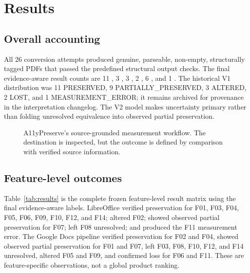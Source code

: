 \section{Results}
\label{sec:results}

\subsection{Overall accounting}

All 26 conversion attempts produced genuine, parseable, non-empty, structurally tagged PDFs that passed the predefined structural output checks. The final evidence-aware result counts are 11 \verifiedpreserved{}, 3 \observedpartial{}, 3 \altered{}, 2 \confirmedlost{}, 6 \unresolved{}, and 1 \measured{}. The historical V1 distribution was 11 PRESERVED, 9 PARTIALLY\_PRESERVED, 3 ALTERED, 2 LOST, and 1 MEASUREMENT\_ERROR; it remains archived for provenance in the interpretation changelog. The V2 model makes uncertainty primary rather than folding unresolved equivalence into observed partial preservation.

\begin{figure}[t]
\centering
{}
\caption{A11yPreserve's source-grounded measurement workflow. The destination is inspected, but the outcome is defined by comparison with verified source information.}
\label{fig:workflow}
\end{figure}

\subsection{Feature-level outcomes}

Table~\ref{tab:results} is the complete frozen feature-level result matrix using the final evidence-aware labels. LibreOffice verified preservation for F01, F03, F04, F05, F06, F09, F10, F12, and F14; altered F02; showed observed partial preservation for F07; left F08 unresolved; and produced the F11 measurement error. The Google Docs pipeline verified preservation for F02 and F04, showed observed partial preservation for F01 and F07, left F03, F08, F10, F12, and F14 unresolved, altered F05 and F09, and confirmed loss for F06 and F11. These are feature-specific observations, not a global product ranking.

